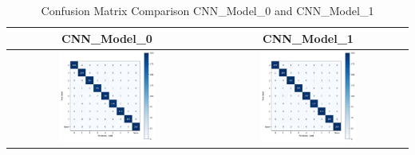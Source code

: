 \begin{table}[h!]
    \centering
    \caption{Confusion Matrix Comparison CNN\_Model\_0 and CNN\_Model\_1}
    \vspace{1.5mm}
    \begin{tabular}{|c|c|}
      \hline
      \textbf{CNN\_Model\_0} & \textbf{CNN\_Model\_1} \\
      \hline
      \includegraphics[width=0.5\textwidth]{Images/Perf_Eval/M0_Conf_mat.jpg} & \includegraphics[width=0.5\textwidth]{Images/Perf_Eval/M1_Conf_mat.png} \\
      \hline
    \end{tabular}
\end{table}

